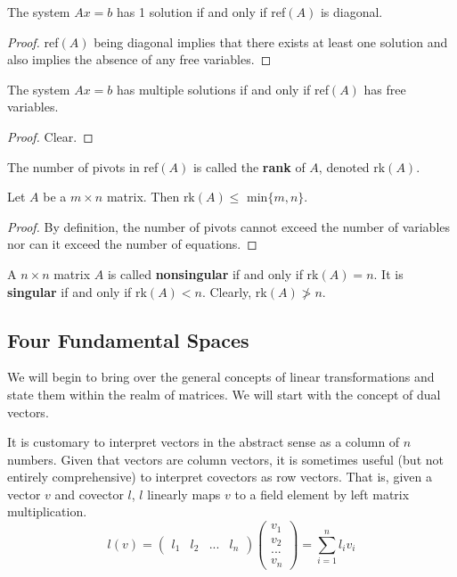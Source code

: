   \begin{theorem}
    The system $A x = b$ has 1 solution if and only if ref$(A)$ is diagonal. 
  \end{theorem}

  \begin{proof}
    ref$(A)$ being diagonal implies that there exists at least one solution and also implies the absence of any free variables. 
  \end{proof}

  \begin{theorem}
    The system $A x = b$ has multiple solutions if and only if ref$(A)$ has free variables. 
  \end{theorem}
  \begin{proof}
    Clear. 
  \end{proof}

  \begin{definition}[Rank]
    The number of pivots in ref$(A)$ is called the \textbf{rank} of $A$, denoted rk$(A)$. 
  \end{definition}

  \begin{theorem}
    Let $A$ be a $m \times n$ matrix. Then rk$(A) \leq$ min$\{m ,n\}$. 
  \end{theorem}
  \begin{proof}
    By definition, the number of pivots cannot exceed the number of variables nor can it exceed the number of equations. 
  \end{proof}

  \begin{definition}
    A $n \times n$ matrix $A$ is called \textbf{nonsingular} if and only if rk$(A) = n$. It is \textbf{singular} if and only if rk$(A) < n$. Clearly, rk$(A) \not> n$. 
  \end{definition}

\subsection{Four Fundamental Spaces}

  We will begin to bring over the general concepts of linear transformations and state them within the realm of matrices. We will start with the concept of dual vectors. 

  It is customary to interpret vectors in the abstract sense as a column of $n$ numbers. Given that vectors are column vectors, it is sometimes useful (but not entirely comprehensive) to interpret covectors as row vectors. That is, given a vector $v$ and covector $l$, $l$ linearly maps $v$ to a field element by left matrix multiplication. 
  \begin{equation}
    l(v) = \begin{pmatrix} l_1 & l_2 & ... & l_n \end{pmatrix} \begin{pmatrix}
    v_1 \\ v_2 \\ ... \\ v_n
    \end{pmatrix} = \sum_{i = 1}^{n} l_i v_i
  \end{equation}

